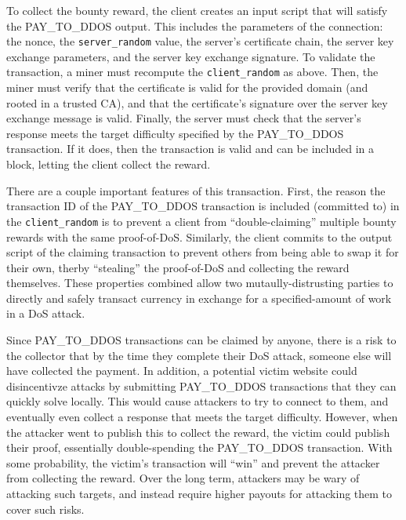 To collect the bounty reward, the client creates an input script that will
satisfy the PAY\_TO\_DDOS output. This includes the parameters of the
connection: the nonce, the \texttt{server\_random} value, the server's
certificate chain, the server key exchange parameters, and the server key
exchange signature. To validate the transaction, a miner must recompute the
\texttt{client\_random} as above. Then, the miner must verify that the
certificate is valid for the provided domain (and rooted in a trusted CA), and
that the certificate's signature over the server key exchange message is valid.
Finally, the server must check that the server's response meets the target
difficulty specified by the PAY\_TO\_DDOS transaction. If it does, then the
transaction is valid and can be included in a block, letting the client collect
the reward.

There are a couple important features of this transaction. First, the reason the
transaction ID of the PAY\_TO\_DDOS transaction is included (committed to) in
the \texttt{client\_random} is to prevent a client from ``double-claiming''
multiple bounty rewards with the same proof-of-DoS. Similarly, the client
commits to the output script of the claiming transaction to
prevent others from being able to swap it for their own, therby ``stealing'' the
proof-of-DoS and collecting the reward themselves. These properties combined allow two
mutaully-distrusting parties to directly and safely transact currency in
exchange for a specified-amount of work in a DoS attack.


Since PAY\_TO\_DDOS transactions can be claimed by anyone, there is a risk to
the collector that by the time they complete their DoS attack, someone else will
have collected the payment. In addition, a potential victim website could
disincentivze attacks by submitting PAY\_TO\_DDOS transactions that they can
quickly solve locally. This would cause attackers to try to connect to them, and
eventually even collect a response that meets the target difficulty. However,
when the attacker went to publish this to collect the reward, the victim could
publish their proof, essentially double-spending the PAY\_TO\_DDOS transaction.
With some probability, the victim's transaction will ``win'' and prevent the
attacker from collecting the reward. Over the long term, attackers may be wary
of attacking such targets, and instead require higher payouts for attacking them
to cover such risks.




